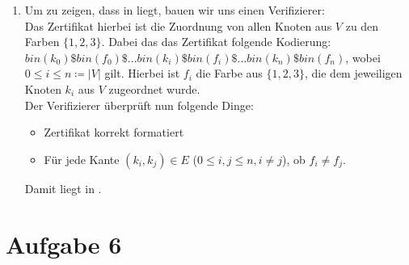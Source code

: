 \documentclass[a4paper,11pt]{scrartcl}
\begin{document}
\begin{enumerate}[label=\alph*)]
	\item	Um zu zeigen, dass  in  liegt, bauen wir uns einen Verifizierer:\\
		Das Zertifikat hierbei ist die Zuordnung von allen Knoten aus $V$ zu den Farben $\{1,2,3\}$. Dabei das das Zertifikat folgende Kodierung:\\
		$bin(k_0)\$bin(f_0)\$...bin(k_i)\$bin(f_i)\$...bin(k_n)\$bin(f_n)$, wobei $0\leq i \leq n \coloneqq \vert V \vert$ gilt. Hierbei ist $f_i$ die Farbe aus $\{1,2,3\}$, die dem jeweiligen Knoten $k_i$ aus $V$ zugeordnet wurde.\\
		Der Verifizierer überprüft nun folgende Dinge:
		\begin{itemize}
		\item Zertifikat korrekt formatiert
		\item Für jede Kante $(k_i,k_j) \in E$ ($0\leq i,j \leq n, i \neq j$), ob $f_i \neq f_j$.
		\end{itemize}
		Damit liegt  in \NP.
	\end{enumerate}
	
	
	\section*{Aufgabe 6}
	
	
\end{document}
